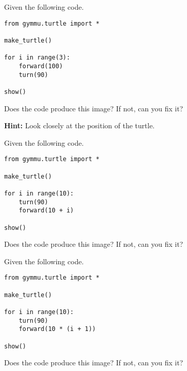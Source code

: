 \documentclass[11pt,a4paper]{report}
\begin{document}
\newpage

\begin{ex}
Given  the following code.
\begin{lstlisting}
from gymmu.turtle import *

make_turtle()

for i in range(3):
    forward(100)
    turn(90)

show()
\end{lstlisting}
Does the code produce this image? If not, can you fix it?

\textbf{Hint:} Look closely at the position of the turtle.
\end{ex}


\newpage
\begin{ex}
Given  the following code.
\begin{lstlisting}
from gymmu.turtle import *

make_turtle()

for i in range(10):
    turn(90)
    forward(10 + i)

show()
\end{lstlisting}
Does the code produce this image? If not, can you fix it?
\end{ex}

\newpage

\begin{ex}
Given  the following code.
\begin{lstlisting}
from gymmu.turtle import *

make_turtle()

for i in range(10):
    turn(90)
    forward(10 * (i + 1))

show()
\end{lstlisting}
Does the code produce this image? If not, can you fix it?
\end{ex}
\end{document}
